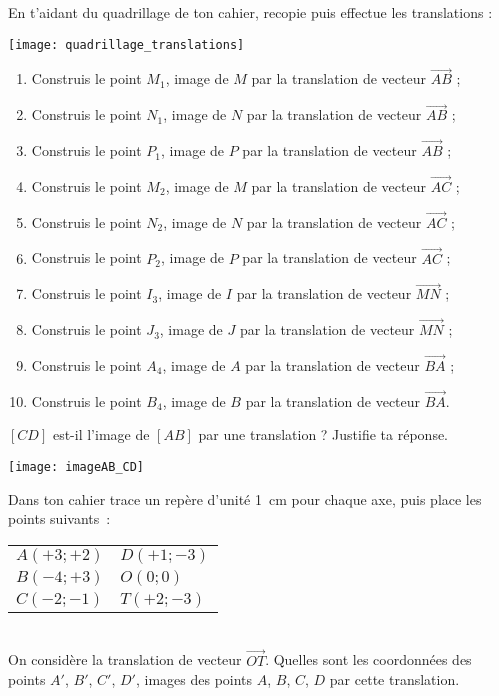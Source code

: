 \begin{exercice}
En t'aidant du quadrillage de ton cahier, recopie puis effectue les translations :
\begin{center} \texttt{[image: quadrillage\_translations]} \end{center}
\begin{enumerate}
 \item Construis le point $M_1$, image de $M$ par la translation de vecteur $\overrightarrow{AB}$ ;
 \item Construis le point $N_1$, image de $N$ par la translation de vecteur $\overrightarrow{AB}$ ;
 \item Construis le point $P_1$, image de $P$ par la translation de vecteur $\overrightarrow{AB}$ ;
 \item Construis le point $M_2$, image de $M$ par la translation de vecteur $\overrightarrow{AC}$ ;
 \item Construis le point $N_2$, image de $N$ par la translation de vecteur $\overrightarrow{AC}$ ;
 \item Construis le point $P_2$, image de $P$ par la translation de vecteur $\overrightarrow{AC}$ ;
 \item Construis le point $I_3$, image de $I$ par la translation de vecteur $\overrightarrow{MN}$ ;
 \item Construis le point $J_3$, image de $J$ par la translation de vecteur $\overrightarrow{MN}$ ;
 \item Construis le point $A_4$, image de $A$ par la translation de vecteur $\overrightarrow{BA}$ ;
 \item Construis le point $B_4$, image de $B$ par la translation de vecteur $\overrightarrow{BA}$.
 \end{enumerate}
\end{exercice}


\begin{exercice}
$[CD]$ est-il l'image de $[AB]$ par une translation ? Justifie ta réponse.
\begin{center} \texttt{[image: imageAB\_CD]} \end{center}
\end{exercice}


\begin{exercice}
Dans ton cahier trace un repère d'unité 1 cm pour chaque axe, puis place les points suivants : \\[0.5em]
\begin{tabular}{l|l}
$A(+ 3 ; + 2)$ \phantom{HELLO} & $D(+ 1 ; - 3)$ \\
$B(- 4 ; + 3)$ \phantom{HELLO} & $O(0 ; 0)$ \\
$C(- 2 ; - 1)$ \phantom{HELLO} & $T(+ 2 ; - 3)$ \\
 \end{tabular} \\

On considère la translation de vecteur $\overrightarrow{OT}$. Quelles sont les coordonnées des points $A'$, $B'$, $C'$, $D'$, images des points $A$, $B$, $C$, $D$ par cette translation.
\end{exercice}

